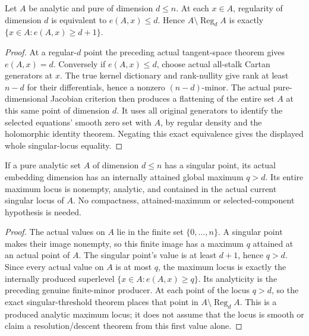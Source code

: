 \begin{lemma}
\label{hir:pure-singular-embedding-dimension-threshold}
\leanok
{}
Let $A$ be analytic and pure of dimension $d\le n$. At each $x\in A$,
regularity of dimension $d$ is equivalent to $e(A,x)\le d$.
Hence $A\setminus\operatorname{Reg}_d A$ is exactly
$\{x\in A:e(A,x)\ge d+1\}$.
\end{lemma}
\begin{proof}
At a regular-$d$ point the preceding actual tangent-space theorem gives
$e(A,x)=d$. Conversely if $e(A,x)\le d$, choose actual all-stalk Cartan
generators at $x$. The true kernel dictionary and rank-nullity give
rank at least $n-d$ for their differentials, hence a nonzero
$(n-d)$-minor. The actual pure-dimensional Jacobian criterion then
produces a flattening of the entire set $A$ at this same point of
dimension $d$. It uses all original generators to identify the
selected equations' smooth zero set with $A$, by regular density and
the holomorphic identity theorem. Negating this exact equivalence
gives the displayed whole singular-locus equality.
\end{proof}

\begin{theorem}
\label{hir:actual-embedding-dimension-maximum-singular-locus}
\leanok
{}
If a pure analytic set $A$ of dimension $d\le n$ has a singular point,
its actual embedding dimension has an internally attained global
maximum $q>d$. Its entire maximum locus is nonempty, analytic, and
contained in the actual current singular locus of $A$. No compactness,
attained-maximum or selected-component hypothesis is needed.
\end{theorem}
\begin{proof}
The actual values on $A$ lie in the finite set $\{0,\ldots,n\}$.
A singular point makes their image nonempty, so this finite image has
a maximum $q$ attained at an actual point of $A$. The singular point's
value is at least $d+1$, hence $q>d$. Since every actual value on $A$
is at most $q$, the maximum locus is exactly the internally produced
superlevel $\{x\in A:e(A,x)\ge q\}$. Its analyticity is the preceding
genuine finite-minor producer. At each point of the locus $q>d$, so
the exact singular-threshold theorem places that point in
$A\setminus\operatorname{Reg}_d A$. This is a produced analytic
maximum locus; it does not assume that the locus is smooth or claim
a resolution/descent theorem from this first value alone.
\end{proof}
